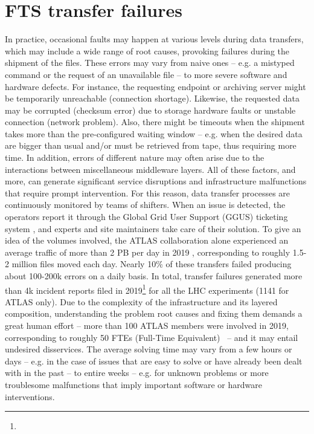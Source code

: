 \section{FTS transfer failures} \label{sec:FTS_failures}


In practice, occasional faults may happen at various levels during data transfers, which may include a wide range of root causes, provoking failures during the shipment of the files.
These errors may vary from naive ones -- e.g. a mistyped command or the request of an unavailable file -- to more severe software and hardware defects.
For instance, the requesting endpoint or archiving server might be temporarily unreachable (connection shortage).
Likewise, the requested data may be corrupted (checksum error) due to storage hardware faults or unstable connection (network problem).
Also, there might be timeouts when the shipment takes more than the pre-configured waiting window -- e.g. when the desired data are bigger than usual and/or must be retrieved from tape, thus requiring more time.
In addition, errors of different nature may often arise due to the interactions between miscellaneous middleware layers.
All of these factors, and more, can generate significant service disruptions and infrastructure malfunctions that require prompt intervention.
For this reason, data transfer processes are continuously monitored by teams of shifters. When an issue is detected, the operators report it through the Global Grid User Support (GGUS) ticketing system \cite{antoni2008ggus}, and experts and site maintainers take care of their solution.
To give an idea of the volumes involved, the ATLAS collaboration alone experienced an average traffic of more than 2 PB per day in 2019 \cite{calafiura2020design_report}, corresponding to roughly 1.5-2 million files moved each day.
Nearly 10\% of these transfers failed producing about 100-200k errors on a daily basis. 
In total, transfer failures generated more than 4k incident reports filed in 2019\footnote{\ggus} for all the LHC experiments (1141 for ATLAS only).
Due to the complexity of the infrastructure and its layered composition, understanding the problem root causes and fixing them demands a great human effort -- more than 100 ATLAS members were involved in 2019, corresponding to roughly 50 FTEs (Full-Time Equivalent)~\cite{jarka2019ftes} -- and it may entail undesired disservices.
The average solving time may vary from a few hours or days -- e.g. in the case of issues that are easy to solve or have already been dealt with in the past -- to entire weeks -- e.g. for unknown problems or more troublesome malfunctions that imply important software or hardware interventions.
